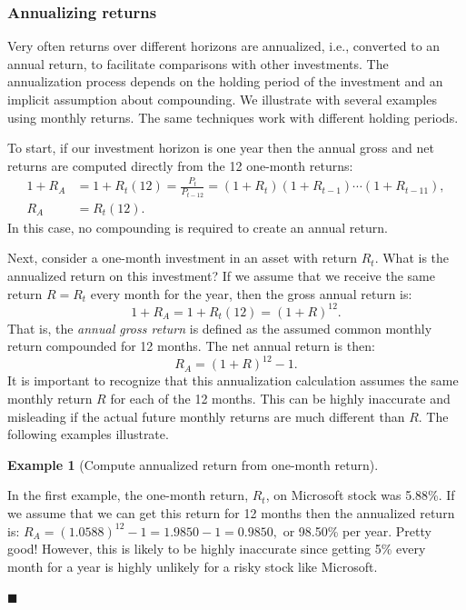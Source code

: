 \documentclass[
  letterpaper,
  DIV=11,
  numbers=noendperiod]{scrreprt}
\theoremstyle{definition}
\theoremstyle{definition}
\newtheorem{example}{Example}[chapter]
\theoremstyle{remark}
\begin{document}
\hypertarget{annualizing-returns}{%
\subsubsection{Annualizing returns}\label{annualizing-returns}}

Very often returns over different horizons are annualized, i.e.,
converted to an annual return, to facilitate comparisons with other
investments. The annualization process depends on the holding period of
the investment and an implicit assumption about compounding. We
illustrate with several examples using monthly returns. The same
techniques work with different holding periods.

To start, if our investment horizon is one year then the annual gross
and net returns are computed directly from the 12 one-month returns:
\begin{align*}
1+R_{A} & =1+R_{t}(12)=\frac{P_{t}}{P_{t-12}}=(1+R_{t})(1+R_{t-1})\cdots(1+R_{t-11}),\\
R_{A} & =R_{t}(12).
\end{align*} In this case, no compounding is required to create an
annual return.

Next, consider a one-month investment in an asset with return \(R_{t}\).
What is the annualized return on this investment? If we assume that we
receive the same return \(R=R_{t}\) every month for the year, then the
gross annual return is: \[1+R_{A}=1+R_{t}(12)=(1+R)^{12}.\] That is, the
\emph{annual gross return}  is defined as the
assumed common monthly return compounded for 12 months. The net annual
return is then: \[R_{A}=(1+R)^{12}-1.\] It is important to recognize
that this annualization calculation assumes the same monthly return
\(R\) for each of the 12 months. This can be highly inaccurate and
misleading if the actual future monthly returns are much different than
\(R\). The following examples illustrate.

\begin{example}[Compute annualized return from one-month
return]\protect\hypertarget{exm-example0111}{}\label{exm-example0111}

In the first example, the one-month return, \(R_{t}\), on Microsoft
stock was 5.88\%. If we assume that we can get this return for 12 months
then the annualized return is:
\(R_{A}=(1.0588)^{12}-1=1.9850-1=0.9850,\) or 98.50\% per year. Pretty
good! However, this is likely to be highly inaccurate since getting 5\%
every month for a year is highly unlikely for a risky stock like
Microsoft.

\hfill{}\(\blacksquare\)

\end{example}
\end{document}
